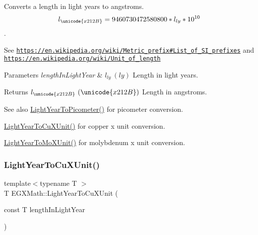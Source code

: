 Converts a length in light years to angstroms. \[ l_{\unicode{x212B}}=9460730472580800 * l_{ly} * 10^{10} \]. 

See \href{https://en.wikipedia.org/wiki/Metric_prefix#List_of_SI_prefixes}{\tt https\+://en.\+wikipedia.\+org/wiki/\+Metric\+\_\+prefix\#\+List\+\_\+of\+\_\+\+S\+I\+\_\+prefixes} and \href{https://en.wikipedia.org/wiki/Unit_of_length}{\tt https\+://en.\+wikipedia.\+org/wiki/\+Unit\+\_\+of\+\_\+length} 
\begin{DoxyParams}{Parameters}
{\em length\+In\+Light\+Year} & $ l_{ly}\ (ly)$ Length in light years. \\
\hline
\end{DoxyParams}
\begin{DoxyReturn}{Returns}
$ l_{\unicode{x212B}}\ (\unicode{x212B})$ Length in angstroms. 
\end{DoxyReturn}
\begin{DoxySeeAlso}{See also}
\mbox{\hyperlink{group___e_g_x_math-_conversions-_length_conversions-_astronomical-_light_year-_s_i_ga6dc5dc3c9584f578c4a935552fb965b7}{Light\+Year\+To\+Picometer()}} for picometer conversion. 

\mbox{\hyperlink{group___e_g_x_math-_conversions-_length_conversions-_astronomical-_light_year-_non-_s_i_ga2a345996e344d547ea6db8b7e9174ae8}{Light\+Year\+To\+Cu\+X\+Unit()}} for copper x unit conversion. 

\mbox{\hyperlink{group___e_g_x_math-_conversions-_length_conversions-_astronomical-_light_year-_non-_s_i_gac275191181b93d118ec2b21cf09ff356}{Light\+Year\+To\+Mo\+X\+Unit()}} for molybdenum x unit conversion. 
\end{DoxySeeAlso}
\mbox{\label{group___e_g_x_math-_conversions-_length_conversions-_astronomical-_light_year-_non-_s_i_ga2a345996e344d547ea6db8b7e9174ae8}} 
\subsubsection{\texorpdfstring{Light\+Year\+To\+Cu\+X\+Unit()}{LightYearToCuXUnit()}}
{\footnotesize\ttfamily template$<$typename T $>$ \\
T E\+G\+X\+Math\+::\+Light\+Year\+To\+Cu\+X\+Unit (\begin{DoxyParamCaption}\item[{const T}]{length\+In\+Light\+Year }\end{DoxyParamCaption})}



